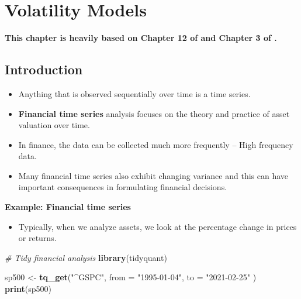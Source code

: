 \documentclass[]{book}
\newenvironment{Shaded}{\begin{snugshade}}{\end{snugshade}}
\newcommand{\CommentTok}[1]{\textcolor[rgb]{0.56,0.35,0.01}{\textit{#1}}}
\newcommand{\DataTypeTok}[1]{\textcolor[rgb]{0.13,0.29,0.53}{#1}}
\newcommand{\KeywordTok}[1]{\textcolor[rgb]{0.13,0.29,0.53}{\textbf{#1}}}
\newcommand{\NormalTok}[1]{#1}
\newcommand{\StringTok}[1]{\textcolor[rgb]{0.31,0.60,0.02}{#1}}
\providecommand{\tightlist}{%
  \setlength{\itemsep}{0pt}\setlength{\parskip}{0pt}}
\begin{document}
\newpage

\hypertarget{volatility-models}{%
\chapter{Volatility Models}\label{volatility-models}}


\textbf{This chapter is heavily based on Chapter 12 of \citet{chatfield2019analysis} and Chapter 3 of \citet{tsay2010analysis} .}

\hypertarget{introduction-1}{%
\section{Introduction}\label{introduction-1}}

\begin{itemize}
\tightlist
\item
  Anything that is observed sequentially over time is a time series.
\end{itemize}

\begin{itemize}
\tightlist
\item
  \textbf{Financial time series} analysis focuses on the theory and practice of asset valuation over time.
\end{itemize}

\begin{itemize}
\tightlist
\item
  In finance, the data can be collected much more frequently -- High frequency data.
\item
  Many financial time series also exhibit changing variance and this can have important consequences in formulating financial decisions.
\end{itemize}

\textbf{Example: Financial time series}

\begin{itemize}
\tightlist
\item
  Typically, when we analyze assets, we look at the percentage change in prices or returns.
\end{itemize}

\begin{Shaded}
\begin{Highlighting}[]
\CommentTok{# Tidy financial analysis }
\KeywordTok{library}\NormalTok{(tidyquant)}

\NormalTok{sp500 <-}\StringTok{ }\KeywordTok{tq_get}\NormalTok{(}\StringTok{"^GSPC"}\NormalTok{, }\DataTypeTok{from =} \StringTok{"1995-01-04"}\NormalTok{, }\DataTypeTok{to =} \StringTok{"2021-02-25"}\NormalTok{ )}
\KeywordTok{print}\NormalTok{(sp500)}
\end{Highlighting}
\end{Shaded}
\end{document}
